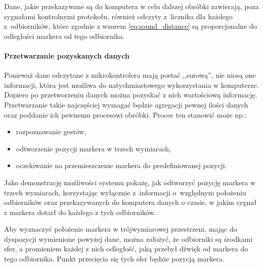 Dane, jakie przekazywane są do komputera w celu dalszej obróbki zawierają, poza sygnałami kontrolnymi protokołu, również odczyty z~licznika dla każdego z~odbiorników, które zgodnie z wzorem \ref{eq:sound_distance} są proporcjonalne do odległości markera od tego odbiornika.

\paragraph{Przetwarzanie pozyskanych danych}
Ponieważ dane odczytane z mikrokontrolera mają postać ,,surową'', nie niosą one informacji, która jest możliwa do natychmiastowego wykorzystania w komputerze. Dopiero po przetworzeniu danych można pozyskać z nich wartościową informację. Przetwarzanie takie najczęściej wymagać będzie agregacji pewnej ilości danych oraz poddanie ich pewnemu procesowi obróbki. Proces ten stanowić może np.:
\begin{itemize}
 \item rozpoznawanie gestów,
 \item odtworzenie pozycji markera w trzech wymiarach,
 \item oczekiwanie na przemieszczenie markera do predefiniowanej pozycji.
\end{itemize}

Jako demonstrację możliwości systemu pokażę, jak odtworzyć pozycję markera w trzech wymiarach, korzystając wyłącznie z~informacji o~względnym położeniu odbiorników oraz przekazywanych do komputera danych o czasie, w jakim sygnał z markera dotarł do każdego z tych odbiorników.

Aby wyznaczyć położenie markera w trójwymiarowej przestrzeni, mając do dyspozycji wymienione powyżej dane, można założyć, że odbiorniki są środkami sfer, a promieniem każdej z nich \ppauza odległość, jaką przebył dźwięk od markera do tego odbiornika. Punkt przecięcia się tych sfer będzie pozycją markera.

